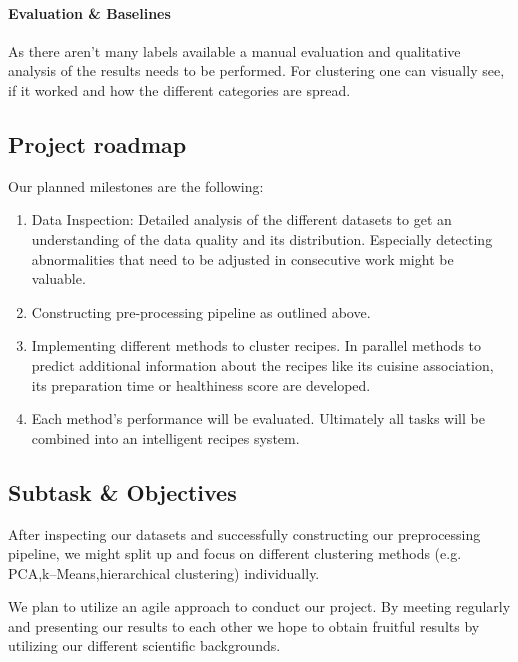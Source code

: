 \documentclass[
     12pt,         %
     a4paper,      %
     BCOR10mm,     %
     DIV14,        %
     ]{article}
\begin{document}
\paragraph{Evaluation \& Baselines} As there aren't many labels available a manual evaluation and qualitative analysis of the results needs to be performed. For clustering one can visually see, if it worked and how the different categories are spread.


\subsection{Project roadmap}

Our planned milestones are the following:

\begin{enumerate}
  \item Data Inspection: Detailed analysis of the different datasets to get an understanding of the data quality and its distribution. Especially detecting abnormalities that need to be adjusted in consecutive work might be valuable.
  \item Constructing pre-processing pipeline as outlined above.
  \item Implementing different methods to cluster recipes. In parallel methods to predict additional information about the recipes like its cuisine association, its preparation time or healthiness score are developed.
  \item Each method's performance will be evaluated. Ultimately all tasks will be combined into an intelligent recipes system.
\end{enumerate}
\subsection{Subtask \& Objectives}
After inspecting our datasets and successfully constructing our preprocessing pipeline, we might split up and focus on different clustering methods (e.g. PCA,k--Means,hierarchical clustering) individually.

We plan to utilize an agile approach to conduct our project. By meeting regularly and presenting our results to each other we hope to obtain fruitful results  by utilizing our different scientific backgrounds.


\end{document}
